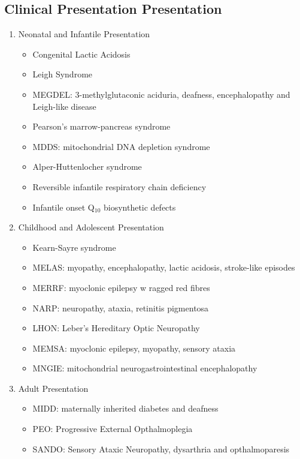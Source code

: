 \documentclass{scrartcl}
\begin{document}
\subsection{Clinical Presentation Presentation}
\label{sec:org5386f85}
\begin{enumerate}
\item Neonatal and Infantile Presentation
\label{sec:org6677e4e}
\begin{itemize}
\item Congenital Lactic Acidosis
\item Leigh Syndrome
\item MEGDEL: 3-methylglutaconic aciduria, deafness, encephalopathy and Leigh-like disease
\item Pearson's marrow-pancreas syndrome
\item MDDS: mitochondrial DNA depletion syndrome
\item Alper-Huttenlocher syndrome
\item Reversible infantile respiratory chain deficiency
\item Infantile onset Q\(_{\text{10}}\) biosynthetic defects
\end{itemize}

\item Childhood and Adolescent Presentation
\label{sec:orge2c4226}
\begin{itemize}
\item Kearn-Sayre syndrome
\item MELAS: myopathy, encephalopathy, lactic acidosis, stroke-like episodes
\item MERRF: myoclonic epilepsy w ragged red fibres
\item NARP: neuropathy, ataxia, retinitis pigmentosa
\item LHON: Leber's Hereditary Optic Neuropathy
\item MEMSA: myoclonic epilepsy, myopathy, sensory ataxia
\item MNGIE: mitochondrial neurogastrointestinal encephalopathy
\end{itemize}

\item Adult Presentation
\label{sec:org1882271}
\begin{itemize}
\item MIDD: maternally inherited diabetes and deafness
\item PEO: Progressive External Opthalmoplegia
\item SANDO: Sensory Ataxic Neuropathy, dysarthria and opthalmoparesis
\end{itemize}
\end{enumerate}
\end{document}
